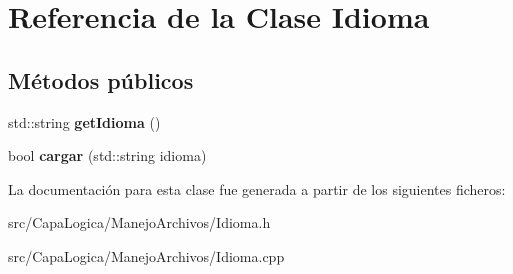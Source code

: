 \hypertarget{class_idioma}{\section{\-Referencia de la \-Clase \-Idioma}
\label{class_idioma}
}
\subsection*{\-Métodos públicos}
\begin{DoxyCompactItemize}
\item 
\hypertarget{class_idioma_a62cfcddfe94e5334713303cd40b73369}{std\-::string {\bfseries get\-Idioma} ()}\label{class_idioma_a62cfcddfe94e5334713303cd40b73369}

\item 
\hypertarget{class_idioma_ac7a3486a4582afb8238261c204c953d9}{bool {\bfseries cargar} (std\-::string idioma)}\label{class_idioma_ac7a3486a4582afb8238261c204c953d9}

\end{DoxyCompactItemize}


\-La documentación para esta clase fue generada a partir de los siguientes ficheros\-:\begin{DoxyCompactItemize}
\item 
src/\-Capa\-Logica/\-Manejo\-Archivos/\-Idioma.\-h\item 
src/\-Capa\-Logica/\-Manejo\-Archivos/\-Idioma.\-cpp\end{DoxyCompactItemize}
